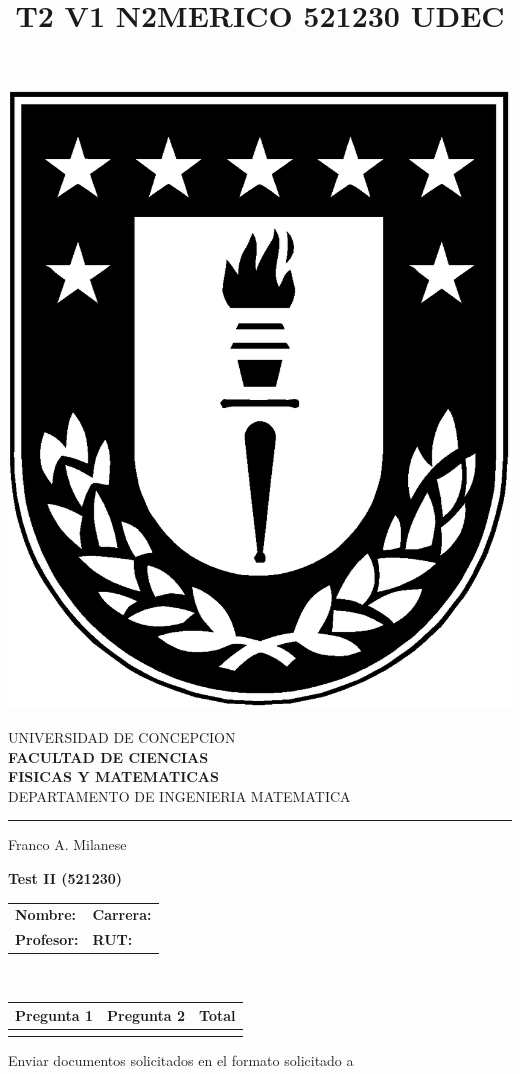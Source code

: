 \documentclass[11pt]{article}
\begin{document}
\title{T2 V1 N2MERICO 521230 UDEC}

\begin{minipage}{0.12\textwidth}
\includegraphics[width=\textwidth]{logoudec.eps}
\end{minipage}
\hspace{5mm}
\begin{minipage}{0.9\textwidth}
UNIVERSIDAD DE CONCEPCION\\
{\small\small\bf 
FACULTAD DE CIENCIAS\\ 
FISICAS Y MATEMATICAS}\\
DEPARTAMENTO DE INGENIERIA MATEMATICA\\
\rule{0.66\textwidth}{.5pt} Franco A. Milanese
\end{minipage}

\vspace{0.5cm}
\centerline{\bf Test II (521230)}
\begin{center}
 \begin{tabular}{p{}p{}}
	\textbf{Nombre:}   &\textbf{Carrera:}\\
	\textbf{Profesor:} & \textbf{ RUT:}
 \end{tabular}
 \\
 \vspace{0.2cm}
 \begin{tabular}{||p{2cm}|p{2cm}||p{2cm}||}
 \hline
 Pregunta 1 &  Pregunta 2 &     Total\\
 \hline

  \vspace{1.5cm} & &       \\
 \hline
 \end{tabular}
 \end{center}
 Enviar documentos solicitados en el formato solicitado a 
\end{document}
